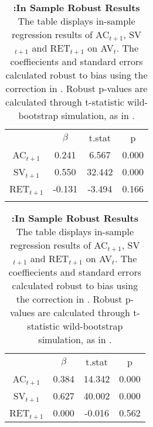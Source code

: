 \begin{table}[!htbp]
	\centering \caption{\textbf{:In Sample Robust Results} \newline
		\footnotesize{The table displays in-sample regression results of AC$_{t+1}$, SV$_{t+1}$ and RET$_{t+1}$ on AV$_{t}$. The coeffiecients and standard errors calculated robust to \citet{Kandel1996} bias using the correction in \citet{Amihud2004}. Robust p-values are calculated through t-statistic wild-bootstrap simulation, as in \citet{mackinnon_bootstrap_2002}.}}
	\label{tab:tab_in_sample_robust}
	\begin{adjustbox}{center,max height=\totalheight}
		\begin{tabular}{cccc}
			\hline
			& $\beta$ & t.stat & p \\
			AC$_{t+1}$ & 0.241 & 6.567 & 0.000 \\
			SV$_{t+1}$ & 0.550 & 32.442 & 0.000 \\
			RET$_{t+1}$ & -0.131 & -3.494 & 0.166 \\
			\hline \\
		\end{tabular}
	\end{adjustbox}
	\begin{adjustbox}{center,max height=\totalheight}
				\begin{tabular}{cccc}
					\hline
			& $\beta$ & t.stat & p \\
			AC$_{t+1}$ & 0.384 & 14.342 & 0.000 \\
			SV$_{t+1}$ & 0.627 & 40.002 & 0.000 \\
			RET$_{t+1}$ & 0.000 & -0.016 & 0.562\\
			\hline
		\end{tabular}
	\end{adjustbox}
%		
\end{table}